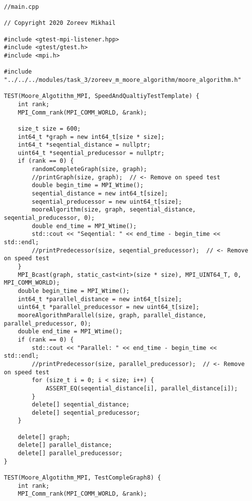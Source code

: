 \documentclass{report}
\begin{document}
\begin{lstlisting}
//main.cpp

// Copyright 2020 Zoreev Mikhail

#include <gtest-mpi-listener.hpp>
#include <gtest/gtest.h>
#include <mpi.h>

#include "../../../modules/task_3/zoreev_m_moore_algorithm/moore_algorithm.h"

TEST(Moore_Algotithm_MPI, SpeedAndQualtiyTestTemplate) {
    int rank;
    MPI_Comm_rank(MPI_COMM_WORLD, &rank);

    size_t size = 600;
    int64_t *graph = new int64_t[size * size];
    int64_t *seqential_distance = nullptr;
    uint64_t *seqential_preducessor = nullptr;
    if (rank == 0) {
        randomCompleteGraph(size, graph);
        //printGraph(size, graph);  // <- Remove on speed test
        double begin_time = MPI_Wtime();
        seqential_distance = new int64_t[size];
        seqential_preducessor = new uint64_t[size];
        mooreAlgorithm(size, graph, seqential_distance, seqential_preducessor, 0);
        double end_time = MPI_Wtime();
        std::cout << "Seqential: " << end_time - begin_time << std::endl;
        //printPredecessor(size, seqential_preducessor);  // <- Remove on speed test
    }
    MPI_Bcast(graph, static_cast<int>(size * size), MPI_UINT64_T, 0, MPI_COMM_WORLD);
    double begin_time = MPI_Wtime();
    int64_t *parallel_distance = new int64_t[size];
    uint64_t *parallel_preducessor = new uint64_t[size];
    mooreAlgorithmParallel(size, graph, parallel_distance, parallel_preducessor, 0);
    double end_time = MPI_Wtime();
    if (rank == 0) {
        std::cout << "Parallel: " << end_time - begin_time << std::endl;
        //printPredecessor(size, parallel_preducessor);  // <- Remove on speed test
        for (size_t i = 0; i < size; i++) {
            ASSERT_EQ(seqential_distance[i], parallel_distance[i]);
        }
        delete[] seqential_distance;
        delete[] seqential_preducessor;
    }

    delete[] graph;
    delete[] parallel_distance;
    delete[] parallel_preducessor;
}

TEST(Moore_Algotithm_MPI, TestCompleGraph8) {
    int rank;
    MPI_Comm_rank(MPI_COMM_WORLD, &rank);


\end{lstlisting}
\end{document}
